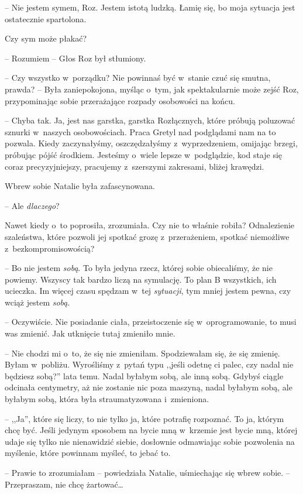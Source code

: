 \documentclass[oneside,polish,11pt,sfheadings]{mwbk}
\begin{document}
-- Nie jestem symem, Roz. Jestem istotą ludzką. Łamię się, bo moja
sytuacja jest ostatecznie spartolona.

Czy sym może płakać? 

-- Rozumiem -- Głos Roz był stłumiony.

-- Czy wszystko w~porządku? Nie powinnaś być w~stanie czuć się smutna,
prawda? -- Była zaniepokojona, myśląc o~tym, jak spektakularnie może
zejść Roz, przypominając sobie przerażające rozpady osobowości na końcu.

-- Chyba tak. Ja, jest nas garstka, garstka Rozłącznych, które próbują
poluzować sznurki w~naszych osobowościach. Praca Gretyl nad podglądami
nam na to pozwala. Kiedy zaczynałyśmy, oszczędzałyśmy z~wyprzedzeniem,
omijając brzegi, próbując pójść środkiem. Jesteśmy o~wiele lepsze w~podglądzie, kod staje się coraz precyzyjniejszy, pracujemy z~szerszymi
zakresami, bliżej krawędzi.

Wbrew sobie Natalie była zafascynowana. 

-- Ale \textit{dlaczego}?

Nawet kiedy o~to poprosiła, zrozumiała. Czy nie to właśnie robiła?
Odnalezienie szaleństwa, które pozwoli jej spotkać grozę z~przerażeniem,
spotkać niemożliwe z~bezkompromisowością?

-- Bo nie jestem \textit{sobą}. To była jedyna rzecz, której sobie
obiecaliśmy, że nie powiemy. Wszyscy tak bardzo liczą na symulację. To
plan B wszystkich, ich ucieczka. Im więcej czasu spędzam w~tej
\textit{sytuacji}, tym mniej jestem pewna, czy wciąż jestem \textit{sobą}.

-- Oczywiście. Nie posiadanie ciała, przeistoczenie się w~oprogramowanie,
to musi was zmienić. Jak utknięcie tutaj zmieniło mnie.

-- Nie chodzi mi o~to, że się nie zmieniłam. Spodziewałam się, że się
zmienię. Byłam w~pobliżu. Wyrośliśmy z~pytań typu ,,jeśli odetnę ci
palec, czy nadal nie będziesz sobą?'' lata temu. Nadal byłabym sobą, ale
inną sobą. Gdybyś ciągle odcinała centymetry, aż nie zostanie nic poza
maszyną, nadal byłabym sobą, ale byłabym sobą, która była
straumatyzowana i~zmieniona.

-- ,,Ja'', które się liczy, to nie tylko ja, które potrafię rozpoznać. To
ja, którym chcę być. Jeśli jedynym sposobem na bycie mną w~krzemie jest
bycie mną, której udaje się tylko nie nienawidzić siebie, dosłownie
odmawiając sobie pozwolenia na myślenie, które powinnam myśleć, to jebać
to.

-- Prawie to zrozumiałam -- powiedziała Natalie, uśmiechając się wbrew
sobie. -- Przepraszam, nie chcę żartować\ldots 
\end{document}
